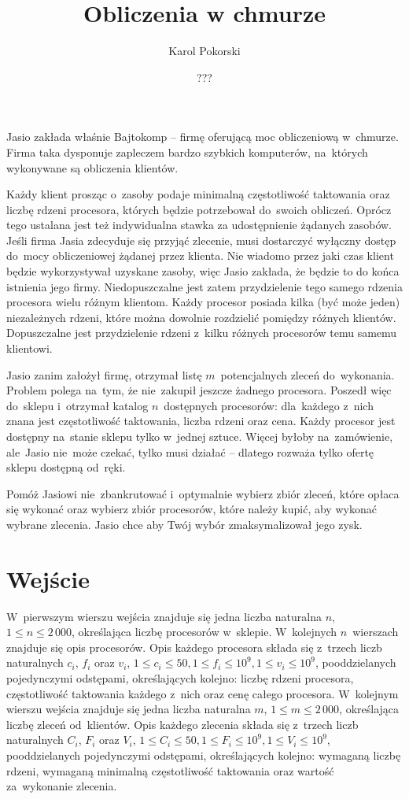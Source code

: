 \documentclass[zad,zawodnik,utf8]{sinol}
\title{Obliczenia w chmurze}
\author{Karol Pokorski} %
\date{???}
\begin{document}
  \begin{tasktext}%
    Jasio zakłada właśnie Bajtokomp -- firmę oferującą moc obliczeniową w~chmurze.
    Firma taka dysponuje zapleczem bardzo szybkich komputerów, na~których
    wykonywane są obliczenia klientów.

    Każdy klient prosząc o~zasoby podaje minimalną częstotliwość taktowania
    oraz liczbę rdzeni procesora, których będzie potrzebował do~swoich obliczeń.
    Oprócz tego ustalana jest też indywidualna stawka za udostępnienie żądanych
    zasobów. Jeśli firma Jasia zdecyduje się przyjąć zlecenie, musi dostarczyć
    wyłączny dostęp do~mocy obliczeniowej żądanej przez klienta. Nie wiadomo
    przez jaki czas klient będzie wykorzystywał uzyskane zasoby, więc Jasio zakłada,
    że będzie to do końca istnienia jego firmy. Niedopuszczalne jest zatem
    przydzielenie tego samego rdzenia procesora wielu różnym klientom.
    Każdy procesor posiada kilka (być może jeden) niezależnych rdzeni, które
    można dowolnie rozdzielić pomiędzy różnych klientów. Dopuszczalne jest
    przydzielenie rdzeni z~kilku różnych procesorów temu samemu klientowi.

    Jasio zanim założył firmę, otrzymał listę $m$~potencjalnych zleceń
    do~wykonania. Problem polega na~tym, że nie~zakupił jeszcze żadnego
    procesora. Poszedł więc do~sklepu i~otrzymał katalog $n$~dostępnych
    procesorów: dla~każdego z~nich znana jest częstotliwość taktowania, liczba
    rdzeni oraz cena. Każdy procesor jest dostępny na~stanie sklepu
    tylko w~jednej sztuce. Więcej byłoby na~zamówienie, ale~Jasio nie~może
    czekać, tylko musi działać -- dlatego rozważa tylko ofertę sklepu dostępną
    od~ręki.

    Pomóż Jasiowi nie~zbankrutować i~optymalnie wybierz zbiór zleceń, które
    opłaca się wykonać oraz wybierz zbiór procesorów, które należy kupić, aby
    wykonać wybrane zlecenia. Jasio chce aby Twój wybór zmaksymalizował jego
    zysk.

    \section{Wejście}
    W~pierwszym wierszu wejścia znajduje się jedna liczba naturalna $n$,
    $1 \le n \le 2\,000$, określająca liczbę procesorów w~sklepie.
    W~kolejnych $n$~wierszach znajduje się opis procesorów.
    Opis każdego procesora składa się z~trzech liczb naturalnych $c_i$, $f_i$ oraz $v_i$,
    $1 \le c_i \le 50, 1 \le f_i \le 10^9, 1 \le v_i \le 10^9$,
    pooddzielanych pojedynczymi odstępami, określających kolejno: liczbę rdzeni procesora,
    częstotliwość taktowania każdego z~nich oraz cenę całego procesora.
    W~kolejnym wierszu wejścia znajduje się jedna liczba naturalna $m$,
    $1 \le m \le 2\,000$, określająca liczbę zleceń od~klientów.
    Opis każdego zlecenia składa się z~trzech liczb naturalnych $C_i$, $F_i$ oraz $V_i$,
    $1 \le C_i \le 50, 1 \le F_i \le 10^9, 1 \le V_i \le 10^9$,
    pooddzielanych pojedynczymi odstępami, określających kolejno: wymaganą liczbę
    rdzeni, wymaganą minimalną częstotliwość taktowania oraz wartość za~wykonanie
    zlecenia.


\end{tasktext}
\end{document}
